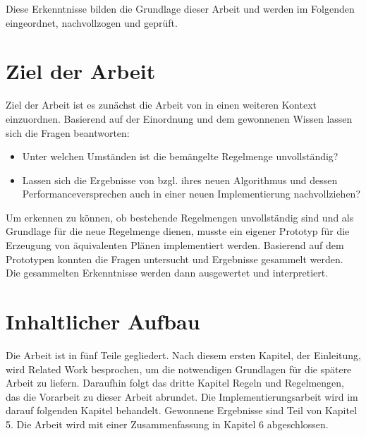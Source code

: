 Diese Erkenntnisse bilden die Grundlage dieser Arbeit und werden im Folgenden eingeordnet, nachvollzogen und geprüft.

\section{Ziel der Arbeit}
Ziel der Arbeit ist es zunächst die Arbeit von \cite{shanbhag2014optimizing} in einen weiteren Kontext einzuordnen. Basierend auf der Einordnung und dem gewonnenen Wissen lassen sich die Fragen beantworten:

\begin{itemize}
\item Unter welchen Umständen ist die bemängelte Regelmenge unvollständig? 
\item Lassen sich die Ergebnisse von \cite{shanbhag2014optimizing} bzgl. ihres neuen Algorithmus und dessen Performanceversprechen auch in einer neuen Implementierung nachvollziehen?
\end{itemize}

Um erkennen zu können, ob bestehende Regelmengen unvollständig sind und als Grundlage für die neue Regelmenge dienen,  musste ein eigener Prototyp für die Erzeugung von äquivalenten Plänen implementiert werden. Basierend auf dem Prototypen konnten die Fragen untersucht und Ergebnisse gesammelt werden. Die gesammelten Erkenntnisse werden dann ausgewertet und interpretiert. 







\section{Inhaltlicher Aufbau}

Die Arbeit ist in fünf Teile gegliedert. Nach diesem ersten Kapitel, der Einleitung, wird Related Work besprochen, um die notwendigen Grundlagen für die spätere Arbeit zu liefern. Daraufhin folgt das dritte Kapitel Regeln und Regelmengen, das die Vorarbeit zu dieser Arbeit abrundet. Die Implementierungsarbeit wird im darauf folgenden Kapitel behandelt. Gewonnene Ergebnisse sind Teil von Kapitel 5. Die Arbeit wird mit einer Zusammenfassung in Kapitel 6 abgeschlossen.

